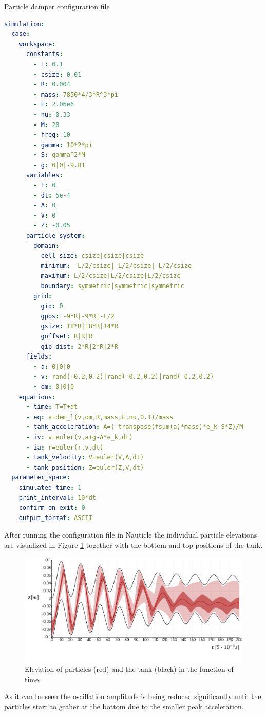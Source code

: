 \documentclass[a4paper,12pt,openany]{book}
\theoremstyle{break}
\begin{document}
\begin{example}{Particle damper configuration file}{}
\lstset{basicstyle=\tiny}
\begin{lstlisting}[language=YAML]
simulation:
  case:
    workspace:
      constants:
        - L: 0.1
        - csize: 0.01
        - R: 0.004
        - mass: 7850*4/3*R^3*pi
        - E: 2.06e6
        - nu: 0.33
        - M: 20
        - freq: 10
        - gamma: 10*2*pi
        - S: gamma^2*M
        - g: 0|0|-9.81
      variables:
        - T: 0
        - dt: 5e-4
        - A: 0
        - V: 0
        - Z: -0.05
      particle_system:
        domain:
          cell_size: csize|csize|csize
          minimum: -L/2/csize|-L/2/csize|-L/2/csize
          maximum: L/2/csize|L/2/csize|L/2/csize
          boundary: symmetric|symmetric|symmetric
        grid:
          gid: 0
          gpos: -9*R|-9*R|-L/2
          gsize: 18*R|18*R|14*R
          goffset: R|R|R
          gip_dist: 2*R|2*R|2*R
      fields:
        - a: 0|0|0
        - v: rand(-0.2,0.2)|rand(-0.2,0.2)|rand(-0.2,0.2)
        - om: 0|0|0
    equations:
      - time: T=T+dt
      - eq: a=dem_l(v,om,R,mass,E,nu,0.1)/mass
      - tank_acceleration: A=(-transpose(fsum(a)*mass)*e_k-S*Z)/M
      - iv: v=euler(v,a+g-A*e_k,dt)
      - ia: r=euler(r,v,dt)
      - tank_velocity: V=euler(V,A,dt)
      - tank_position: Z=euler(Z,V,dt)
  parameter_space:
    simulated_time: 1
    print_interval: 10*dt
    confirm_on_exit: 0
    output_format: ASCII
\end{lstlisting}
\end{example}
After running the configuration file in Nauticle the individual particle elevations are visualized in Figure \ref{fig:particle_damper_result} together with the bottom and top positions of the tank.
\begin{figure}[H]
  \includegraphics[scale=0.6]{particle_damper_time_series.pdf}
  \centering
  \caption{Elevation of particles (red) and the tank (black) in the function of time.}
  \label{fig:particle_damper_result}
\end{figure}\vspace*{3pt}
As it can be seen the oscillation amplitude is being reduced significantly until the particles start to gather at the bottom due to the smaller peak acceleration.
\end{document}
